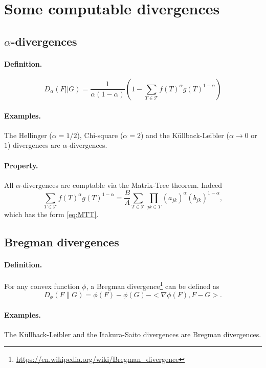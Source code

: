 \documentclass[a4paper, 10pt]{article}
\newcommand{\Tcal}{\mathcal{T}}
\begin{document}
\section{Some computable divergences} 

\subsection{$\alpha$-divergences} 

\paragraph{Definition.} \cite{Min05}
$$
D_\alpha(F || G) = \frac1{\alpha (1-\alpha)} \left(1 - \sum_{T \in \Tcal} f(T)^\alpha g(T)^{1 - \alpha} \right)
$$

\paragraph{Examples.} The Hellinger ($\alpha = 1/2$), Chi-square ($\alpha = 2$) and the Küllback-Leibler ($\alpha \rightarrow 0$ or $1$) divergences are $\alpha$-divergences.

\paragraph{Property.}  All $\alpha$-divergences are comptable via the Matrix-Tree theorem. Indeed
$$
\sum_{T \in \Tcal} f(T)^\alpha g(T)^{1 - \alpha} 
 = \frac{B}{A} \sum_{T \in \Tcal} \prod_{jk \in T} (a_{jk})^{\alpha} (b_{jk})^{1 - \alpha},
$$
which has the form \eqref{eq:MTT}.

\subsection{Bregman divergences} 

\paragraph{Definition.} For any convex function $\phi$, a Bregman divergence\footnote{\url{https://en.wikipedia.org/wiki/Bregman_divergence}} can be defined as 
$$
D_\phi(F \| G) = \phi(F) - \phi(G) - <\nabla \phi(F), F - G>.
$$

\paragraph{Examples.} The Küllback-Leibler and the Itakura-Saito divergences are Bregman divergences.
\end{document}
